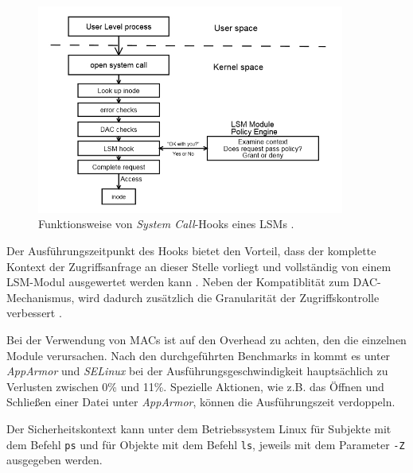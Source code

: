 \documentclass[../main.tex]{subfiles}
\begin{document}
			\begin{figure}[h]
					\centering
					\includegraphics[width=0.9\textwidth]{./images/sec_LSMHook.jpg}
					\caption{Funktionsweise von \emph{System Call}-Hooks eines LSMs \cite[S.3]{LSMFramework}.}
					\label{fig:sec_LSMHook}
			\end{figure}

			Der Ausführungszeitpunkt des Hooks bietet den Vorteil, dass der komplette Kontext der Zugriffsanfrage an dieser Stelle vorliegt und vollständig von einem LSM-Modul ausgewertet werden kann \cite[S.2]{LSMFramework}. Neben der Kompatiblität zum DAC-Mechanismus, wird dadurch zusätzlich die Granularität der Zugriffskontrolle verbessert \cite{LSMDesign}.

			Bei der Verwendung von MACs ist auf den Overhead zu achten, den die einzelnen Module verursachen. Nach den durchgeführten Benchmarks in \cite[S.51ff.]{SELinuxApparmor} kommt es unter \emph{AppArmor} und \emph{SELinux} bei der Ausführungsgeschwindigkeit hauptsächlich zu Verlusten zwischen 0\% und 11\%. Spezielle Aktionen, wie z.B. das Öffnen und Schließen einer Datei unter \emph{AppArmor}, können die Ausführungszeit verdoppeln.

			Der Sicherheitskontext kann unter dem Betriebssystem Linux für Subjekte mit dem Befehl \texttt{ps} und für Objekte mit dem Befehl \texttt{ls}, jeweils mit dem Parameter \texttt{-Z} ausgegeben werden.



\end{document}
